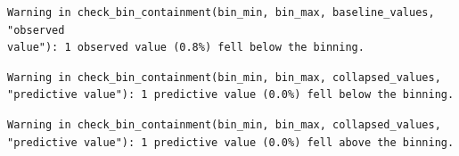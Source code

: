 \documentclass[
  letterpaper,
  DIV=11,
  numbers=noendperiod]{scrartcl}
\newenvironment{Shaded}{\begin{snugshade}}{\end{snugshade}}
\newcommand{\AttributeTok}[1]{\textcolor[rgb]{0.40,0.45,0.13}{#1}}
\newcommand{\ControlFlowTok}[1]{\textcolor[rgb]{0.00,0.23,0.31}{#1}}
\newcommand{\DecValTok}[1]{\textcolor[rgb]{0.68,0.00,0.00}{#1}}
\newcommand{\FunctionTok}[1]{\textcolor[rgb]{0.28,0.35,0.67}{#1}}
\newcommand{\NormalTok}[1]{\textcolor[rgb]{0.00,0.23,0.31}{#1}}
\newcommand{\OtherTok}[1]{\textcolor[rgb]{0.00,0.23,0.31}{#1}}
\newcommand{\SpecialCharTok}[1]{\textcolor[rgb]{0.37,0.37,0.37}{#1}}
\newcommand{\StringTok}[1]{\textcolor[rgb]{0.13,0.47,0.30}{#1}}
\begin{document}
\begin{verbatim}
Warning in check_bin_containment(bin_min, bin_max, baseline_values, "observed
value"): 1 observed value (0.8%) fell below the binning.
\end{verbatim}

\begin{Shaded}
\end{Shaded}

\begin{verbatim}
Warning in check_bin_containment(bin_min, bin_max, collapsed_values,
"predictive value"): 1 predictive value (0.0%) fell below the binning.
\end{verbatim}

\begin{verbatim}
Warning in check_bin_containment(bin_min, bin_max, collapsed_values,
"predictive value"): 1 predictive value (0.0%) fell above the binning.
\end{verbatim}
\end{document}

